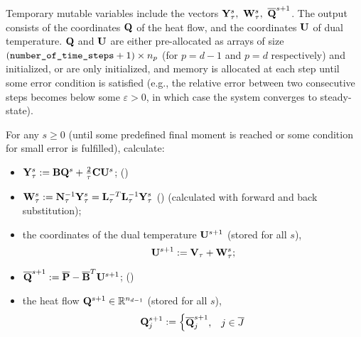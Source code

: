 \begin{algorithm}
\begin{enumerate}
      Temporary mutable variables include the vectors
      ${\bf Y}_\tau^s,\ {\bf W}_\tau^s,\ \overline{\bf Q}^{s + 1}$.
      The output consists of the coordinates ${\bf Q}$ of the heat flow,
      and the coordinates ${\bf U}$ of dual temperature.
      ${\bf Q}$ and ${\bf U}$ are either pre-allocated as arrays of size
      $(\verb|number_of_time_steps| + 1) \times n_p$
      (for $p = d - 1$ and $p = d$ respectively) and initialized,
      or are only initialized, and memory is allocated at each step until some
      error condition is satisfied
      (e.g., the relative error between two consecutive steps becomes below some
      $\varepsilon > 0$, in which case the system converges to steady-state).

      For any $s \geq 0$ (until some predefined final moment is reached or some
      condition for small error is fulfilled), calculate:
      \begin{itemize}
        \item
          \qquad\;
          $ {\bf Y}_\tau^s
            := {\bf B} {\bf Q}^s + \frac{2}{\tau} {\bf C} {\bf U}^s$;
          \hfill{}\textup{(\theequation)}
        \item
          \qquad\;
          $ {\bf W}_\tau^s
            := {\bf N}_\tau^{-1} {\bf Y}_\tau^s
            = {\bf L}_\tau^{-T} {\bf L}_\tau^{-1} {\bf Y}_\tau^s$
          \hfill{}\textup{(\theequation)}
          \newline
          (calculated with forward and back substitution);
        \item
          the coordinates of the dual temperature ${\bf U}^{s + 1}$
          (stored for all $s$),
          \begin{equation}
            {\bf U}^{s + 1} := {\bf V}_\tau + {\bf W}_\tau^s;
          \end{equation}
        \item
          \qquad\;
          $ \overline{\bf Q}^{s + 1}
            := \overline{\bf P} - \overline{\bf B}^T {\bf U}^{s + 1}$;
          \hfill{}\textup{(\theequation)}
        \item
          the heat flow ${\bf Q}^{s + 1} \in \mathbb{R}^{n_{d - 1}}$
          (stored for all $s$),
          \begin{equation}
            {\bf Q}^{s + 1}_j :=
            \begin{cases}
              \overline{\bf Q}^{s + 1}_j, & j \in \overline{J} \\

\end{cases}
\end{equation}
\end{itemize}
\end{enumerate}
\end{algorithm}
